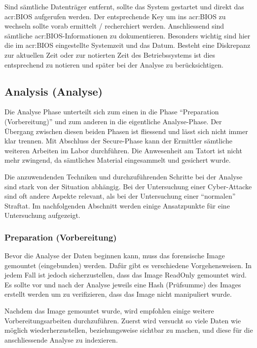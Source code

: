 Sind sämtliche Datenträger entfernt, sollte das System gestartet und direkt das \gls{acr:BIOS} aufgerufen werden. Der entsprechende Key um ins \gls{acr:BIOS} zu wechseln sollte vorab ermittelt / recherchiert werden. Anschliessend sind sämtliche \gls{acr:BIOS}-Informationen zu dokumentieren. Besonders wichtig sind hier die im \gls{acr:BIOS} eingestellte Systemzeit und das Datum. Besteht eine Diskrepanz zur aktuellen Zeit oder zur notierten Zeit des Betriebssystems ist dies entsprechend zu notieren und später bei der Analyse zu berücksichtigen.

\subsection{Analysis (Analyse)}
Die Analyse Phase unterteilt sich zum einen in die Phase "`Preparation (Vorbereitung)"' und zum anderen in die eigentliche Analyse-Phase. Der Übergang zwischen diesen beiden Phasen ist fliessend und lässt sich nicht immer klar trennen. Mit Abschluss der Secure-Phase kann der Ermittler sämtliche weiteren Arbeiten im Labor durchführen. Die Anwesenheit am Tatort ist nicht mehr zwingend, da sämtliches Material eingesammelt und gesichert wurde.

Die anzuwendenden Techniken und durchzuführenden Schritte bei der Analyse sind stark von der Situation abhängig. Bei der Untersuchung einer Cyber-Attacke sind oft andere Aspekte relevant, als bei der Untersuchung einer "`normalen"' Straftat. Im nachfolgenden Abschnitt werden einige Ansatzpunkte für eine Untersuchung aufgezeigt.

\subsubsection{Preparation (Vorbereitung)}
Bevor die Analyse der Daten beginnen kann, muss das forensische Image gemountet (eingebunden) werden. Dafür gibt es verschiedene Vorgehensweisen. In jedem Fall ist jedoch sicherzustellen, dass das Image ReadOnly gemountet wird. Es sollte vor und nach der Analyse jeweils eine Hash (Prüfsumme) des Images erstellt werden um zu verifizieren, dass das Image nicht manipuliert wurde.

Nachdem das Image gemountet wurde, wird empfohlen einige weitere Vorbereitungsarbeiten durchzuführen. Zuerst wird versucht so viele Daten wie möglich wiederherzustellen, beziehungsweise sichtbar zu machen, und diese für die anschliessende Analyse zu indexieren.

